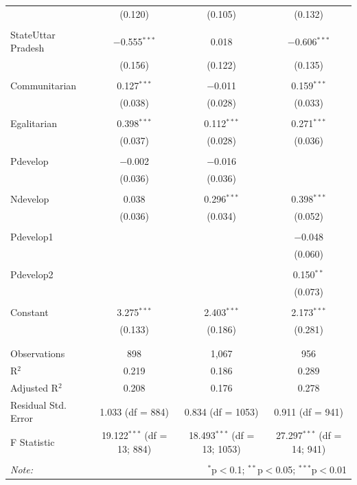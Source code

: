 \documentclass[
]{article}
\begin{document}
\begin{table}[!htbp]
\begin{tabular}{@{\extracolsep{5pt}}lccc}
  & (0.120) & (0.105) & (0.132) \\ 
  & & & \\ 
 StateUttar Pradesh & $-$0.555$^{***}$ & 0.018 & $-$0.606$^{***}$ \\ 
  & (0.156) & (0.122) & (0.135) \\ 
  & & & \\ 
 Communitarian & 0.127$^{***}$ & $-$0.011 & 0.159$^{***}$ \\ 
  & (0.038) & (0.028) & (0.033) \\ 
  & & & \\ 
 Egalitarian & 0.398$^{***}$ & 0.112$^{***}$ & 0.271$^{***}$ \\ 
  & (0.037) & (0.028) & (0.036) \\ 
  & & & \\ 
 Pdevelop & $-$0.002 & $-$0.016 &  \\ 
  & (0.036) & (0.036) &  \\ 
  & & & \\ 
 Ndevelop & 0.038 & 0.296$^{***}$ & 0.398$^{***}$ \\ 
  & (0.036) & (0.034) & (0.052) \\ 
  & & & \\ 
 Pdevelop1 &  &  & $-$0.048 \\ 
  &  &  & (0.060) \\ 
  & & & \\ 
 Pdevelop2 &  &  & 0.150$^{**}$ \\ 
  &  &  & (0.073) \\ 
  & & & \\ 
 Constant & 3.275$^{***}$ & 2.403$^{***}$ & 2.173$^{***}$ \\ 
  & (0.133) & (0.186) & (0.281) \\ 
  & & & \\ 
\hline \\[-1.8ex] 
Observations & 898 & 1,067 & 956 \\ 
R$^{2}$ & 0.219 & 0.186 & 0.289 \\ 
Adjusted R$^{2}$ & 0.208 & 0.176 & 0.278 \\ 
Residual Std. Error & 1.033 (df = 884) & 0.834 (df = 1053) & 0.911 (df = 941) \\ 
F Statistic & 19.122$^{***}$ (df = 13; 884) & 18.493$^{***}$ (df = 13; 1053) & 27.297$^{***}$ (df = 14; 941) \\ 
\hline 
\hline \\[-1.8ex] 
\textit{Note:}  & \multicolumn{3}{r}{$^{*}$p$<$0.1; $^{**}$p$<$0.05; $^{***}$p$<$0.01} \\ 
\end{tabular} 
\end{table} 
\endgroup
\end{document}
